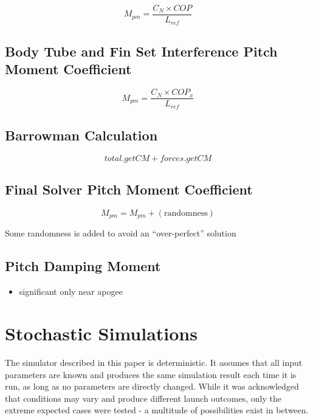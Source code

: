 \documentclass[]{book}
\providecommand{\tightlist}{%
  \setlength{\itemsep}{0pt}\setlength{\parskip}{0pt}}
\begin{document}
\begin{equation}
M_{pm} = \dfrac{C_N \times COP}{L_{ref}}
\end{equation}

\subsection{Body Tube and Fin Set Interference Pitch Moment
Coefficient}\label{body-tube-and-fin-set-interference-pitch-moment-coefficient}

\begin{equation}
M_{pm} = \dfrac{C_N \times COP_x}{L_{ref}}
\end{equation}

\subsection{Barrowman Calculation}\label{barrowman-calculation}

\begin{equation}
total.getCM + forces.getCM
\end{equation}

\subsection{Final Solver Pitch Moment
Coefficient}\label{final-solver-pitch-moment-coefficient}

\begin{equation}
M_{pm} = M_{pm} + \left( \text{randomness}  \right)
\end{equation}

Some randomness is added to avoid an ``over-perfect'' solution

\subsection{Pitch Damping Moment}\label{pitch-damping-moment-1}

\begin{itemize}
\tightlist
\item
  significant only near apogee
\end{itemize}

\section{Stochastic Simulations}\label{stochastic-simulations}

The simulator described in this paper is deterministic. It assumes that
all input parameters are known and produces the same simulation result
each time it is run, as long as no parameters are directly changed.
While it was acknowledged that conditions may vary and produce different
launch outcomes, only the extreme expected cases were tested - a
multitude of possibilities exist in between.
\end{document}
